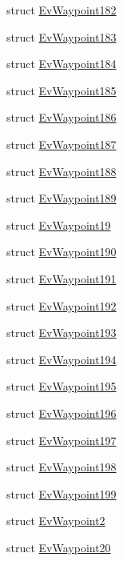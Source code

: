 \begin{DoxyCompactItemize}
struct \hyperlink{structmove__base__z__client_1_1EvWaypoint182}{Ev\+Waypoint182}
\item 
struct \hyperlink{structmove__base__z__client_1_1EvWaypoint183}{Ev\+Waypoint183}
\item 
struct \hyperlink{structmove__base__z__client_1_1EvWaypoint184}{Ev\+Waypoint184}
\item 
struct \hyperlink{structmove__base__z__client_1_1EvWaypoint185}{Ev\+Waypoint185}
\item 
struct \hyperlink{structmove__base__z__client_1_1EvWaypoint186}{Ev\+Waypoint186}
\item 
struct \hyperlink{structmove__base__z__client_1_1EvWaypoint187}{Ev\+Waypoint187}
\item 
struct \hyperlink{structmove__base__z__client_1_1EvWaypoint188}{Ev\+Waypoint188}
\item 
struct \hyperlink{structmove__base__z__client_1_1EvWaypoint189}{Ev\+Waypoint189}
\item 
struct \hyperlink{structmove__base__z__client_1_1EvWaypoint19}{Ev\+Waypoint19}
\item 
struct \hyperlink{structmove__base__z__client_1_1EvWaypoint190}{Ev\+Waypoint190}
\item 
struct \hyperlink{structmove__base__z__client_1_1EvWaypoint191}{Ev\+Waypoint191}
\item 
struct \hyperlink{structmove__base__z__client_1_1EvWaypoint192}{Ev\+Waypoint192}
\item 
struct \hyperlink{structmove__base__z__client_1_1EvWaypoint193}{Ev\+Waypoint193}
\item 
struct \hyperlink{structmove__base__z__client_1_1EvWaypoint194}{Ev\+Waypoint194}
\item 
struct \hyperlink{structmove__base__z__client_1_1EvWaypoint195}{Ev\+Waypoint195}
\item 
struct \hyperlink{structmove__base__z__client_1_1EvWaypoint196}{Ev\+Waypoint196}
\item 
struct \hyperlink{structmove__base__z__client_1_1EvWaypoint197}{Ev\+Waypoint197}
\item 
struct \hyperlink{structmove__base__z__client_1_1EvWaypoint198}{Ev\+Waypoint198}
\item 
struct \hyperlink{structmove__base__z__client_1_1EvWaypoint199}{Ev\+Waypoint199}
\item 
struct \hyperlink{structmove__base__z__client_1_1EvWaypoint2}{Ev\+Waypoint2}
\item 
struct \hyperlink{structmove__base__z__client_1_1EvWaypoint20}{Ev\+Waypoint20}

\end{DoxyCompactItemize}
